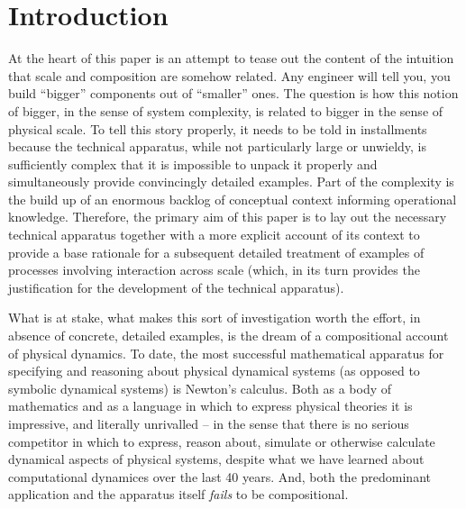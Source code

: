 \section{Introduction}\label{sec:introduction} %

At the heart of this paper is an attempt to tease out the content of
the intuition that scale and composition are somehow related. Any
engineer will tell you, you build ``bigger'' components out of
``smaller'' ones. The question is how this notion of bigger, in the
sense of system complexity, is related to bigger in the sense of
physical scale. To tell this story properly, it needs to be told in
installments because the technical apparatus, while not particularly
large or unwieldy, is sufficiently complex that it is impossible to
unpack it properly and simultaneously provide convincingly detailed
examples. Part of the complexity is the build up of an enormous
backlog of conceptual context informing operational
knowledge. Therefore, the primary aim of this paper is to lay out the
necessary technical apparatus together with a more explicit account of
its context to provide a base rationale for a subsequent detailed
treatment of examples of processes involving interaction across scale
(which, in its turn provides the justification for the development of
the technical apparatus).

What is at stake, what makes this sort of investigation worth the
effort, in absence of concrete, detailed examples, is the dream of a
compositional account of physical dynamics. To date, the most
successful mathematical apparatus for specifying and reasoning about
physical dynamical systems (as opposed to symbolic dynamical systems)
is Newton's calculus. Both as a body of mathematics and as a language
in which to express physical theories it is impressive, and literally
unrivalled -- in the sense that there is no serious competitor in
which to express, reason about, simulate or otherwise calculate
dynamical aspects of physical systems, despite what we have learned
about computational dynamices over the last 40 years. And, both the
predominant application and the apparatus itself \emph{fails} to be
compositional. 


